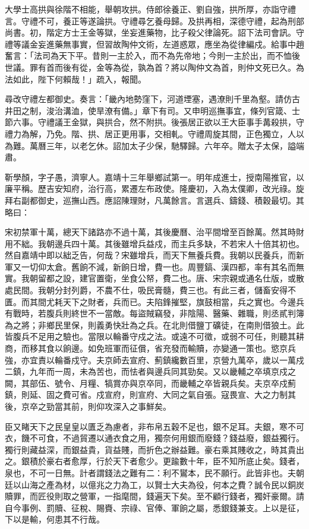 \begin{pinyinscope}
大學士高拱與徐階不相能，舉朝攻拱。侍郎徐養正、劉自強，拱所厚，亦詣守禮言。守禮不可，養正等遂論拱。守禮尋乞養母歸。及拱再相，深德守禮，起為刑部尚書。初，階定方士王金等獄，坐妄進藥物，比子殺父律論死。詔下法司會訊。守禮等議金妄進藥無事實，但習故陶仲文術，左道惑眾，應坐為從律編戍。給事中趙奮言：「法司為天下平。昔則一主於入，而不為先帝地；今則一主於出，而不恤後世議。罪有首而後有從，金等為從，孰為首？將以陶仲文為首，則仲文死已久。為法如此，陛下何賴哉！」疏入，報聞。

尋改守禮左都御史。奏言：「畿內地勢窪下，河道堙塞，遇潦則千里為壑。請仿古井田之制，浚治溝洫，使旱潦有備。」章下有司。又申明巡撫事宜，條列官箴、士節六事。守禮議王金獄，與拱合，然不附拱。後張居正欲以王大臣事手冓殺拱，守禮力為解，乃免。階、拱、居正更用事，交相軋。守禮周旋其間，正色獨立，人以為難。萬曆三年，以老乞休。詔加太子少保，馳驛歸。六年卒。贈太子太保，謚端肅。

靳學顏，字子愚，濟寧人。嘉靖十三年舉鄉試第一。明年成進士，授南陽推官，以廉平稱。歷吉安知府，治行高，累遷左布政使。隆慶初，入為太僕卿，改光祿。旋拜右副都御史，巡撫山西。應詔陳理財，凡萬餘言。言選兵、鑄錢、積穀最切。其略曰：

宋初禁軍十萬，總天下諸路亦不過十萬，其後慶曆、治平間增至百餘萬。然其時財用不絀。我朝邊兵四十萬。其後雖增兵益戍，而主兵多缺，不若宋人十倍其初也。然自嘉靖中即以絀乏告，何哉？宋雖增兵，而天下無養兵費。我朝以民養兵，而新軍又一切仰太倉。舊餉不減，新餉日增，費一也。周豐鎬、漢四都，率有其名而無實。我朝留都之設，建官置衛，坐食公帑，費二也。唐、宋宗親或通名仕版，或散處民間。我朝分封列爵，不農不仕，吸民膏髓，費三也。有此三者，儲畜安得不匱。而其間尤耗天下之財者，兵而已。夫陷鋒摧堅，旗鼓相當，兵之實也。今邊兵有戰時，若腹兵則終世不一當敵。每盜賊竊發，非陰陽、醫藥、雜職，則丞貳判簿為之將；非鄉民里保，則義勇快壯為之兵。在北則借鹽丁礦徒，在南則借狼土。此皆腹兵不足用之驗也。當限以輪番守戍之法。或遠不可徵，或弱不可任，則聽其耕商，而移其食以餉邊。如免班軍而征償，省充發而輸贖，亦變通一策也。慾京兵強，亦宜責以輪番戍守。夫京師去宣府、薊鎮纔數百里，京營九萬卒，歲以一萬戍二鎮，九年而一周，未為苦也，而怯者與邊兵同其勁矣。又以畿輔之卒填京戍之闕，其部伍、號令、月糧、犒賞亦與京卒同，而畿輔之卒皆親兵矣。夫京卒戍薊鎮，則延、固之費可省。戍宣府，則宣府、大同之氣自張。寇畏宣、大之力制其後，京卒之勁當其前，則仰攻深入之事鮮矣。

臣又睹天下之民皇皇以匱乏為慮者，非布帛五穀不足也，銀不足耳。夫銀，寒不可衣，饑不可食，不過貿遷以通衣食之用，獨奈何用銀而廢錢？錢益廢，銀益獨行。獨行則藏益深，而銀益貴，貨益賤，而折色之辦益難。豪右乘其賤收之，時其貴出之。銀積於豪右者愈厚，行於天下者愈少。更踰數十年，臣不知所底止矣。錢者，泉也，不可一日無。計者謂錢法之難有二：利不鸑本，民不願行。此皆非也。夫朝廷以山海之產為材，以億兆之力為工，以賢士大夫為役，何本之費？誠令民以銅炭贖罪，而匠役則取之營軍，一指麾間，錢遍天下矣。至不顧行錢者，獨奸豪爾。請自今事例、罰贖、征稅、賜賚、宗祿、官俸、軍餉之屬，悉銀錢兼支。上以是征，下以是輸，何患其不行哉。


\end{pinyinscope}
